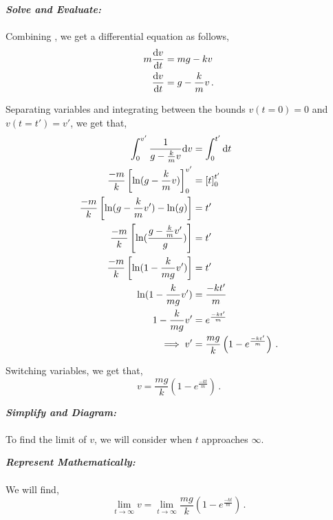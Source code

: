 \begin{subquestions}
\begin{subsubquestions}
\textbf{\textit{Solve and Evaluate:}} \\ \\
Combining , we get a differential equation as follows,
\begin{align}
	m\frac{\mathrm{d}v}{\mathrm{d}t} & = mg - kv \nonumber \\
	\frac{\mathrm{d}v}{\mathrm{d}t} & = g -\frac{k}{m}v \,.
\end{align}

Separating variables and integrating between the bounds $v(t=0)=0$ and $v(t=t')=v'$, we get that,
\begin{align}
	\int_{0}^{v'}\frac{1}{g-\frac{k}{m}v} \mathrm{d} v & = \int_{0}^{t'} \mathrm{d} t \nonumber \\
	\frac{-m}{k}\left[\ln(g-\frac{k}{m}v)\right]_{0}^{v'} & = \left[t\right]_0^{t'} \nonumber \\
	\frac{-m}{k}\left[\ln(g-\frac{k}{m}v')-\ln(g)\right] & = t' \nonumber \\
	\frac{-m}{k}\left[\ln(\frac{g-\frac{k}{m}v'}{g})\right] & = t' \nonumber \\
	\frac{-m}{k}\left[\ln(1-\frac{k}{mg}v')\right] & = t' \nonumber \\
	\ln(1-\frac{k}{mg}v') & = \frac{-kt'}{m} \nonumber \\
	1-\frac{k}{mg}v' & = e^{\frac{-kt'}{m}} \nonumber \\
	\implies v' & = \frac{mg}{k}\left(1-e^{\frac{-kt'}{m}}\right) \,.
\end{align}

Switching variables, we get that,
\begin{equation}
	v = \frac{mg}{k}\left(1-e^{\frac{-kt}{m}}\right) \,.
\end{equation}


\subsubquestion

\textbf{\textit{Simplify and Diagram:}} \\ \\
To find the limit of $v$, we will consider when $t$ approaches $\infty$.




\textbf{\textit{Represent Mathematically:}} \\ \\
We will find,
\begin{equation}
	\lim_{t\rightarrow \infty} v = \lim_{t\rightarrow \infty}      \frac{mg}{k}\left(1-e^{\frac{-kt}{m}}\right) \label{2005:q5:TLim} \,.
\end{equation}





\end{subsubquestions}
\end{subquestions}
